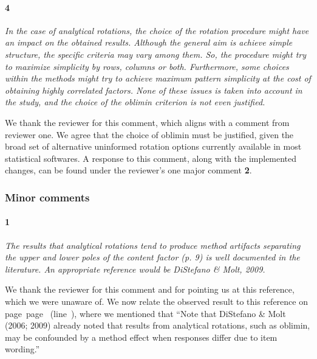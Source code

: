 \documentclass[a4paper]{article}
\begin{document}
\paragraph{4} \textit{In the case of analytical rotations, the choice of the rotation procedure might have an impact on the obtained results. Although the general aim is achieve simple structure, the specific criteria may vary among them. So, the procedure might try to maximize simplicity by rows, columns or both. Furthermore, some choices within the methods might try to achieve maximum pattern simplicity at the cost of obtaining highly correlated factors. None of these issues is taken into account in the study, and the choice of the oblimin criterion is not even justified.}

We thank the reviewer for this comment, which aligns with a comment from reviewer one. We agree that the choice of oblimin must be justified, given the broad set of alternative uninformed rotation options currently available in most statistical softwares. A response to this comment, along with the implemented changes, can be found under the reviewer's one major comment \textbf{2}.

\subsubsection*{Minor comments}

\paragraph{1} \textit{The results that analytical rotations tend to produce method artifacts separating the upper and lower poles of the content factor (p. 9) is well documented in the literature. An appropriate reference would be DiStefano \& Molt, 2009.}


We thank the reviewer for this comment and for pointing us at this reference, which we were unaware of. We now relate the observed result to this reference on page~page~\pageref{refpage:R2Mi1a} (line~), where we mentioned that \textquotedblleft Note that DiStefano \& Molt (2006; 2009) already noted that results from analytical rotations, such as oblimin, may be confounded by a method effect when responses differ due to item wording.\textquotedblright

%
\end{document}
